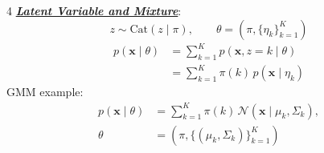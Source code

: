 \documentclass[12pt]{article}
\newcommand{\bulletPoint}[1]{\ul{\textit{\textbf{#1}}}}
\begin{document}
\begin{multicols*}{4}
\bulletPoint{Latent Variable and Mixture}:
\useshortskip \begin{equation*}
    z\sim \mathrm{Cat}(z\mid \pi),\qquad
    \theta=(\pi,\{\eta_k\}_{k=1}^{K})
\end{equation*}
\useshortskip \begin{equation*}
    \begin{split}
        p(\mathbf{x}\mid\theta)
        &=\sum_{k=1}^{K}p(\mathbf{x},z=k\mid\theta) \\
        &=\sum_{k=1}^{K}\pi(k)\,p(\mathbf{x}\mid\eta_k)
    \end{split}
\end{equation*}
GMM example:
\useshortskip \begin{equation*}
    \begin{split}
        p(\mathbf{x}\mid\theta)
        &=\sum_{k=1}^{K}\pi(k)\,\mathcal{N}(\mathbf{x}\mid\mu_k,\Sigma_k),\\
        \theta&=(\pi,\{(\mu_k,\Sigma_k)\}_{k=1}^{K})
    \end{split}
\end{equation*}


\end{multicols*}
\end{document}
